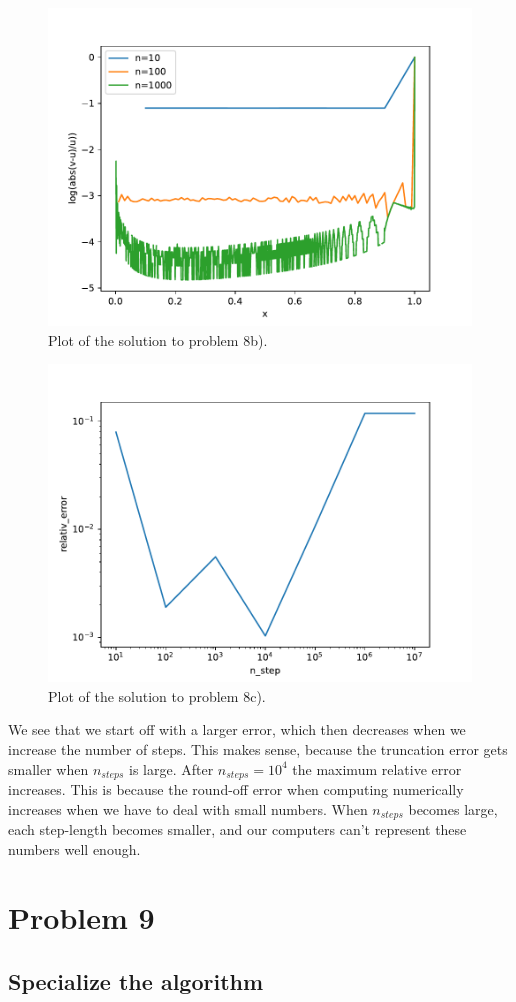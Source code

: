 \documentclass[english,notitlepage]{article}  %
\begin{document}
\begin{figure}[H]
  \centering
  \includegraphics[width=0.6\linewidth]{../Code/log10_rel_err.pdf}
  \caption{Plot of the solution to problem 8b).}
  \label{fig:problem8b}
\end{figure}

\begin{figure}[H]
  \centering
  \includegraphics[width=0.6\linewidth]{../Code/Problem_8_c_plot.pdf}
  \caption{Plot of the solution to problem 8c).}
  \label{fig:problem8c}
\end{figure}

We see that we start off with a larger error, which then decreases when we
increase the number of steps. This makes sense, because the truncation error
gets smaller when $n_{steps}$ is large. After $n_{steps} = 10^4$ the maximum
relative error increases. This is because the round-off error when computing
numerically increases when we have to deal with small numbers. When $n_{steps}$
becomes large, each step-length becomes smaller, and our computers can't
represent these numbers well enough.

\section*{Problem 9}

  \subsection*{Specialize the algorithm}
\end{document}
